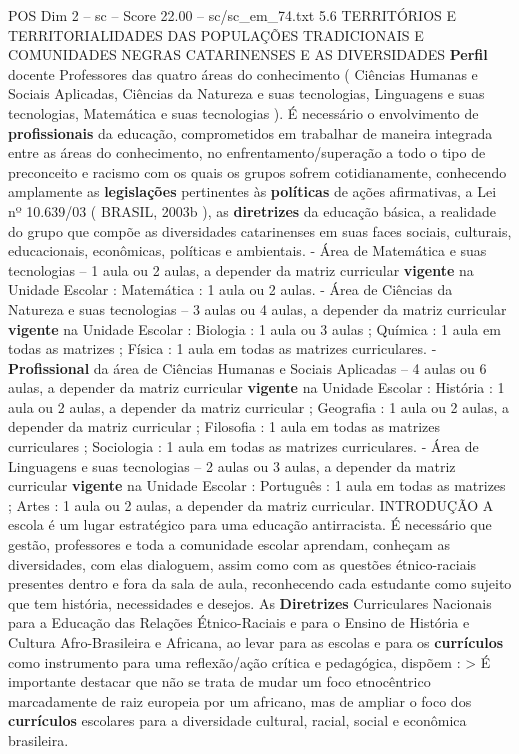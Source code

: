 \begin{textsample}{POS Dim 2 – sc – Score 22.00 – sc/sc\_em\_74.txt}  \label{ex:f2_pos_011}
5.6 TERRITÓRIOS E TERRITORIALIDADES DAS POPULAÇÕES TRADICIONAIS E COMUNIDADES NEGRAS CATARINENSES E AS DIVERSIDADES \textbf{Perfil} docente Professores das quatro áreas do conhecimento ( Ciências Humanas e Sociais Aplicadas, Ciências da Natureza e suas tecnologias, Linguagens e suas tecnologias, Matemática e suas tecnologias ).
É necessário o envolvimento de \textbf{profissionais} da educação, comprometidos em trabalhar de maneira integrada entre as áreas do conhecimento, no enfrentamento/superação a todo o tipo de preconceito e racismo com os quais os grupos sofrem cotidianamente, conhecendo amplamente as \textbf{legislações} pertinentes às \textbf{políticas} de ações afirmativas, a Lei nº 10.639/03 ( BRASIL, 2003b ), as \textbf{diretrizes} da educação básica, a realidade do grupo que compõe as diversidades catarinenses em suas faces sociais, culturais, educacionais, econômicas, políticas e ambientais. - Área de Matemática e suas tecnologias – 1 aula ou 2 aulas, a depender da matriz curricular \textbf{vigente} na Unidade Escolar : Matemática : 1 aula ou 2 aulas. - Área de Ciências da Natureza e suas tecnologias – 3 aulas ou 4 aulas, a depender da matriz curricular \textbf{vigente} na Unidade Escolar : Biologia : 1 aula ou 3 aulas ; Química : 1 aula em todas as matrizes ; Física : 1 aula em todas as matrizes curriculares. - \textbf{Profissional} da área de Ciências Humanas e Sociais Aplicadas – 4 aulas ou 6 aulas, a depender da matriz curricular \textbf{vigente} na Unidade Escolar : História : 1 aula ou 2 aulas, a depender da matriz curricular ; Geografia : 1 aula ou 2 aulas, a depender da matriz curricular ; Filosofia : 1 aula em todas as matrizes curriculares ; Sociologia : 1 aula em todas as matrizes curriculares. - Área de Linguagens e suas tecnologias – 2 aulas ou 3 aulas, a depender da matriz curricular \textbf{vigente} na Unidade Escolar : Português : 1 aula em todas as matrizes ; Artes : 1 aula ou 2 aulas, a depender da matriz curricular.
INTRODUÇÃO A escola é um lugar estratégico para uma educação antirracista.
É necessário que gestão, professores e toda a comunidade escolar aprendam, conheçam as diversidades, com elas dialoguem, assim como com as questões étnico-raciais presentes dentro e fora da sala de aula, reconhecendo cada estudante como sujeito que tem história, necessidades e desejos.
As \textbf{Diretrizes} Curriculares Nacionais para a Educação das Relações Étnico-Raciais e para o Ensino de História e Cultura Afro-Brasileira e Africana, ao levar para as escolas e para os \textbf{currículos} como instrumento para uma reflexão/ação crítica e pedagógica, dispõem : > É importante destacar que não se trata de mudar um foco etnocêntrico marcadamente de raiz europeia por um africano, mas de ampliar o foco dos \textbf{currículos} escolares para a diversidade cultural, racial, social e econômica brasileira.

\end{textsample}
